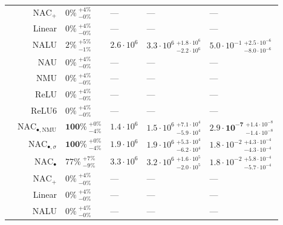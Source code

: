 \begin{longtable}{crllll}
\nopagebreak
 & $\mathrm{NAC}_{+}$ & $0\% {~}^{+4\%}_{-0\%}$ & --- & --- & ---\\

\nopagebreak
 & Linear & $0\% {~}^{+4\%}_{-0\%}$ & --- & --- & ---\\

\nopagebreak
 & NALU & $2\% {~}^{+5\%}_{-1\%}$ & $2.6 \cdot 10^{6}$ & $3.3 \cdot 10^{6} {~}^{+1.8 \cdot 10^{6}}_{-2.2 \cdot 10^{6}}$ & $5.0 \cdot 10^{-1} {~}^{+2.5 \cdot 10^{-6}}_{-8.0 \cdot 10^{-6}}$\\

\nopagebreak
 & NAU & $0\% {~}^{+4\%}_{-0\%}$ & --- & --- & ---\\

\nopagebreak
 & NMU & $0\% {~}^{+4\%}_{-0\%}$ & --- & --- & ---\\

\nopagebreak
 & ReLU & $0\% {~}^{+4\%}_{-0\%}$ & --- & --- & ---\\

\nopagebreak
\multirow{-10}{*}{\centering\arraybackslash $\sqrt{z}$} & ReLU6 & $0\% {~}^{+4\%}_{-0\%}$ & --- & --- & ---\\
\cmidrule{1-6}
 & $\mathrm{NAC}_{\bullet,\mathrm{NMU}}$ & $\mathbf{100\%} {~}^{+0\%}_{-4\%}$ & $1.4 \cdot 10^{6}$ & $1.5 \cdot 10^{6} {~}^{+7.1 \cdot 10^{4}}_{-5.9 \cdot 10^{4}}$ & $\mathbf{2.9 \cdot 10^{-7}} {~}^{+1.4 \cdot 10^{-8}}_{-1.4 \cdot 10^{-8}}$\\

\nopagebreak
 & $\mathrm{NAC}_{\bullet,\sigma}$ & $\mathbf{100\%} {~}^{+0\%}_{-4\%}$ & $1.9 \cdot 10^{6}$ & $1.9 \cdot 10^{6} {~}^{+5.3 \cdot 10^{4}}_{-6.2 \cdot 10^{4}}$ & $1.8 \cdot 10^{-2} {~}^{+4.3 \cdot 10^{-4}}_{-4.3 \cdot 10^{-4}}$\\

\nopagebreak
 & $\mathrm{NAC}_{\bullet}$ & $77\% {~}^{+7\%}_{-9\%}$ & $3.3 \cdot 10^{6}$ & $3.2 \cdot 10^{6} {~}^{+1.6 \cdot 10^{5}}_{-2.0 \cdot 10^{5}}$ & $1.8 \cdot 10^{-2} {~}^{+5.8 \cdot 10^{-4}}_{-5.7 \cdot 10^{-4}}$\\

\nopagebreak
 & $\mathrm{NAC}_{+}$ & $0\% {~}^{+4\%}_{-0\%}$ & --- & --- & ---\\

\nopagebreak
 & Linear & $0\% {~}^{+4\%}_{-0\%}$ & --- & --- & ---\\

\nopagebreak
 & NALU & $0\% {~}^{+4\%}_{-0\%}$ & --- & --- & ---\\


\end{longtable}

